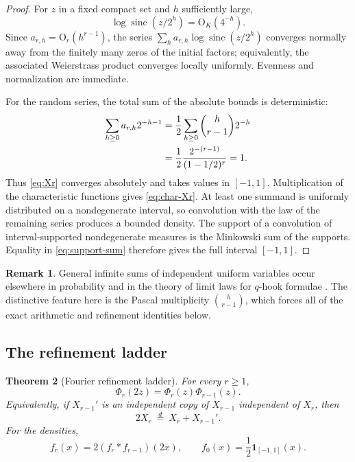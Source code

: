 \documentclass[11pt,a4paper]{article}
\theoremstyle{frontier}
\newtheorem{theorem}{Theorem}[section]
\theoremstyle{definition}
\newtheorem{remark}[theorem]{Remark}
\newcommand{\sinc}{\operatorname{sinc}}
\newcommand{\bigO}{\mathrm O}
\begin{document}
\begin{proof}
For $z$ in a fixed compact set and $h$ sufficiently large,
\[
 \log\sinc(z/2^h)=\bigO_K(4^{-h}).
\]
Since $a_{r,h}=\bigO_r(h^{r-1})$, the series
$\sum_h a_{r,h}\log\sinc(z/2^h)$ converges normally away from the finitely many zeros of the initial factors; equivalently, the associated Weierstrass product converges locally uniformly.  Evenness and normalization are immediate.

For the random series, the total sum of the absolute bounds is deterministic:
\begin{align}
 \sum_{h\ge0}a_{r,h}2^{-h-1}
 &=\frac12\sum_{h\ge0}\binom h{r-1}2^{-h}\notag\\
 &=\frac12\frac{2^{-(r-1)}}{(1-1/2)^r}=1.\label{eq:support-sum}
\end{align}
Thus \eqref{eq:Xr} converges absolutely and takes values in $[-1,1]$.  Multiplication of the characteristic functions gives \eqref{eq:char-Xr}.  At least one summand is uniformly distributed on a nondegenerate interval, so convolution with the law of the remaining series produces a bounded density.  The support of a convolution of interval-supported nondegenerate measures is the Minkowski sum of the supports.  Equality in \eqref{eq:support-sum} therefore gives the full interval $[-1,1]$.
\end{proof}

\begin{remark}
General infinite sums of independent uniform variables occur elsewhere in probability and in the theory of limit laws for $q$-hook formulae \cite{jessen-wintner,billey-swanson}.  The distinctive feature here is the Pascal multiplicity $\binom h{r-1}$, which forces all of the exact arithmetic and refinement identities below.
\end{remark}

\subsection{The refinement ladder}

\begin{theorem}[Fourier refinement ladder]\label{thm:refinement}
For every $r\ge1$,
\begin{equation}\label{eq:refinement-fourier}
  \Phi_r(2z)=\Phi_r(z)\Phi_{r-1}(z).
\end{equation}
Equivalently, if $X_{r-1}'$ is an independent copy of $X_{r-1}$ independent of $X_r$, then
\begin{equation}\label{eq:refinement-prob}
  2X_r\ \stackrel{d}{=}\ X_r+X_{r-1}'.
\end{equation}
For the densities,
\begin{equation}\label{eq:refinement-density}
  f_r(x)=2(f_r*f_{r-1})(2x),
  \qquad
  f_0(x)=\frac12\mathbf 1_{[-1,1]}(x).
\end{equation}
\end{theorem}
\end{document}
